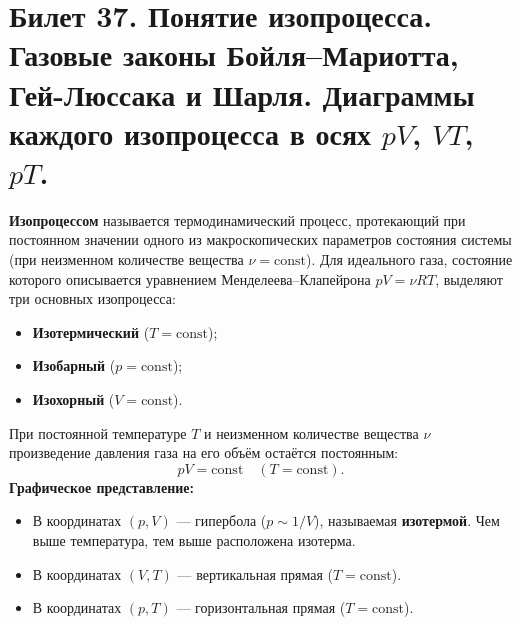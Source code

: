 \section{Билет 37. Понятие изопроцесса. Газовые законы Бойля–Мариотта, Гей-Люссака и Шарля. Диаграммы каждого изопроцесса в осях $pV$, $VT$, $pT$.}

\begin{definition}
\textbf{Изопроцессом} называется термодинамический процесс, протекающий при постоянном значении одного из макроскопических параметров состояния системы (при неизменном количестве вещества $\nu = \text{const}$).
Для идеального газа, состояние которого описывается уравнением Менделеева--Клапейрона $pV = \nu RT$, выделяют три основных изопроцесса:
\begin{itemize}
    \item \textbf{Изотермический} ($T = \text{const}$);
    \item \textbf{Изобарный} ($p = \text{const}$);
    \item \textbf{Изохорный} ($V = \text{const}$).
\end{itemize}
\end{definition}

\begin{theorem}
При постоянной температуре $T$ и неизменном количестве вещества $\nu$ произведение давления газа на его объём остаётся постоянным:
\begin{equation}
    pV = \text{const} \quad (T = \text{const}). \label{eq:boyle_mariotte_37}
\end{equation}
\textbf{Графическое представление:}
\begin{itemize}
    \item В координатах $(p, V)$ --- гипербола ($p \sim 1/V$), называемая \textbf{изотермой}. Чем выше температура, тем выше расположена изотерма.
    \item В координатах $(V, T)$ --- вертикальная прямая ($T = \text{const}$).
    \item В координатах $(p, T)$ --- горизонтальная прямая ($T = \text{const}$).
\end{itemize}
\end{theorem}

